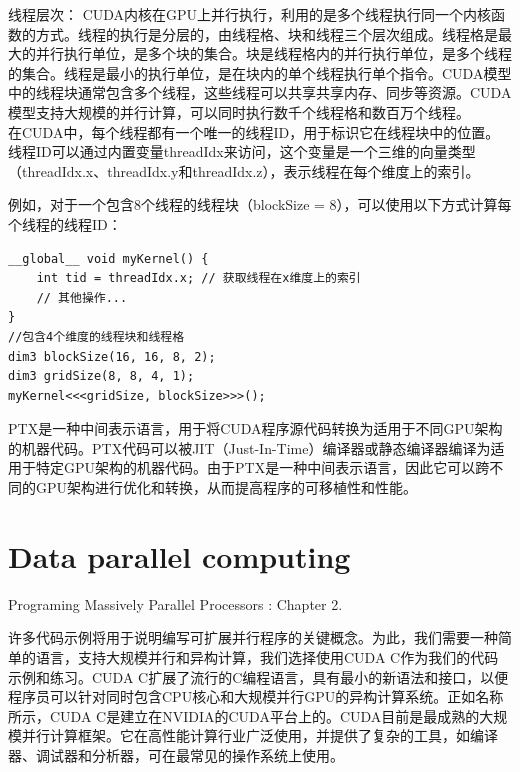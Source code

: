 \documentclass[11pt]{ctexart}
\begin{document}
线程层次：
CUDA内核在GPU上并行执行，利用的是多个线程执行同一个内核函数的方式。线程的执行是分层的，由线程格、块和线程三个层次组成。线程格是最大的并行执行单位，是多个块的集合。块是线程格内的并行执行单位，是多个线程的集合。线程是最小的执行单位，是在块内的单个线程执行单个指令。CUDA模型中的线程块通常包含多个线程，这些线程可以共享共享内存、同步等资源。CUDA模型支持大规模的并行计算，可以同时执行数千个线程格和数百万个线程。\\


在CUDA中，每个线程都有一个唯一的线程ID，用于标识它在线程块中的位置。线程ID可以通过内置变量threadIdx来访问，这个变量是一个三维的向量类型（threadIdx.x、threadIdx.y和threadIdx.z），表示线程在每个维度上的索引。

例如，对于一个包含8个线程的线程块（blockSize = 8），可以使用以下方式计算每个线程的线程ID：

\begin{lstlisting}
__global__ void myKernel() {
    int tid = threadIdx.x; // 获取线程在x维度上的索引
    // 其他操作...
}
//包含4个维度的线程块和线程格
dim3 blockSize(16, 16, 8, 2);
dim3 gridSize(8, 8, 4, 1);
myKernel<<<gridSize, blockSize>>>();

\end{lstlisting}

PTX是一种中间表示语言，用于将CUDA程序源代码转换为适用于不同GPU架构的机器代码。PTX代码可以被JIT（Just-In-Time）编译器或静态编译器编译为适用于特定GPU架构的机器代码。由于PTX是一种中间表示语言，因此它可以跨不同的GPU架构进行优化和转换，从而提高程序的可移植性和性能。

\newpage
\section{Data parallel computing}
Programing Massively Parallel Processors :  Chapter 2.

许多代码示例将用于说明编写可扩展并行程序的关键概念。为此，我们需要一种简单的语言，支持大规模并行和异构计算，我们选择使用CUDA C作为我们的代码示例和练习。CUDA C扩展了流行的C编程语言，具有最小的新语法和接口，以便程序员可以针对同时包含CPU核心和大规模并行GPU的异构计算系统。正如名称所示，CUDA C是建立在NVIDIA的CUDA平台上的。CUDA目前是最成熟的大规模并行计算框架。它在高性能计算行业广泛使用，并提供了复杂的工具，如编译器、调试器和分析器，可在最常见的操作系统上使用。
\end{document}
